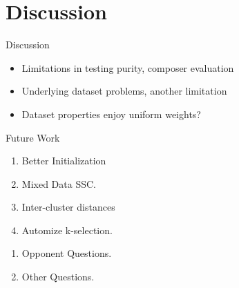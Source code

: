 \documentclass[aspectratio=1610]{beamer}
\begin{document}
\section{Discussion}



\begin{frame}{Discussion}
  \begin{itemize}
    \item Limitations in testing purity, composer evaluation
    \item Underlying dataset problems, another limitation
    \item Dataset properties enjoy uniform weights?
  \end{itemize}
\end{frame}

\begin{frame}{Future Work}
  \begin{enumerate}
    \item Better Initialization
    \item Mixed Data SSC.
    \item Inter-cluster distances
    \item Automize k-selection.
  \end{enumerate}
\end{frame}

\begin{frame}[standout]
  \begin{enumerate}
    \item \centering Opponent Questions.
    \item Other Questions.
  \end{enumerate}

\end{frame}
\end{document}
